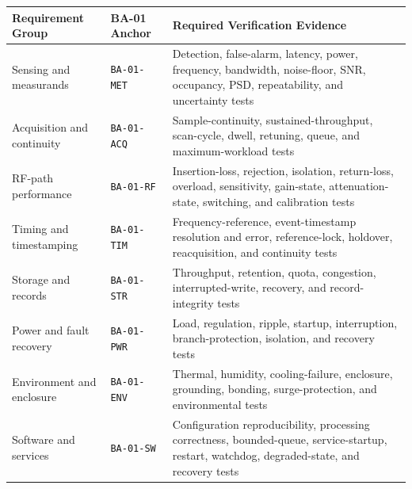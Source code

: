 \documentclass[11pt,a4paper]{article}
\begin{document}
	\begin{table}[htbp]
		\centering
		\small
		\renewcommand{\arraystretch}{1.15}
		\begin{tabularx}{\columnwidth}{
				>{\raggedright\arraybackslash}p{3.0cm}
				>{\raggedright\arraybackslash}p{2.5cm}
				>{\raggedright\arraybackslash}X}
			\toprule
			\textbf{Requirement Group} &
			\textbf{BA-01 Anchor} &
			\textbf{Required Verification Evidence} \\
			\midrule
			
			Sensing and measurands &
			\texttt{BA-01-MET} &
			Detection, false-alarm, latency, power, frequency, bandwidth,
			noise-floor, SNR, occupancy, PSD, repeatability, and uncertainty tests \\
			
			Acquisition and continuity &
			\texttt{BA-01-ACQ} &
			Sample-continuity, sustained-throughput, scan-cycle, dwell,
			retuning, queue, and maximum-workload tests \\
			
			RF-path performance &
			\texttt{BA-01-RF} &
			Insertion-loss, rejection, isolation, return-loss, overload,
			sensitivity, gain-state, attenuation-state, switching, and calibration
			tests \\
			
			Timing and timestamping &
			\texttt{BA-01-TIM} &
			Frequency-reference, event-timestamp resolution and error,
			reference-lock, holdover, reacquisition, and continuity tests \\
			
			Storage and records &
			\texttt{BA-01-STR} &
			Throughput, retention, quota, congestion, interrupted-write,
			recovery, and record-integrity tests \\
			
			Power and fault recovery &
			\texttt{BA-01-PWR} &
			Load, regulation, ripple, startup, interruption, branch-protection,
			isolation, and recovery tests \\
			
			Environment and enclosure &
			\texttt{BA-01-ENV} &
			Thermal, humidity, cooling-failure, enclosure, grounding, bonding,
			surge-protection, and environmental tests \\
			
			Software and services &
			\texttt{BA-01-SW} &
			Configuration reproducibility, processing correctness, bounded-queue,
			service-startup, restart, watchdog, degraded-state, and recovery tests \\
			

\end{tabularx}
\end{table}
\end{document}
